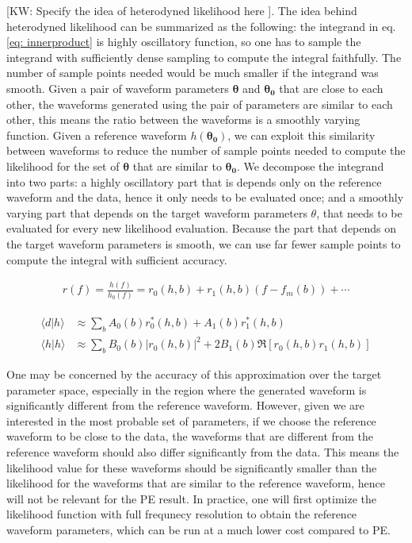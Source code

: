 \documentclass[twocolumn]{aastex631}
\newcommand{\kw}[1]{{\color{rb4}[KW: #1 ]}}
\begin{document}
\kw{Specify the idea of heterodyned likelihood here}. The idea behind
heterodyned likelihood can be summarized as the following: the integrand in eq.
\ref{eq: innerproduct} is highly oscillatory function, so one has to sample the
integrand with sufficiently dense sampling to compute the integral faithfully.
The number of sample points needed would be much smaller if the integrand was
smooth. Given a pair of waveform parameters $\mathbf{\theta}$ and
$\mathbf{\theta_0}$ that are close to each other, the waveforms generated using
the pair of parameters are similar to each other, this means the ratio between
the waveforms is a smoothly varying function. Given a reference waveform
$h(\mathbf{\theta_0})$, we can exploit this similarity between waveforms to
reduce the number of sample points needed to compute the likelihood for the set
of $\mathbf{\theta}$ that are similar to $\mathbf{\theta_0}$. We decompose
the integrand into two parts: a highly oscillatory part that is depends only on
the reference waveform and the data, hence it only needs to be evaluated once;
and a smoothly varying part that depends on the target waveform parameters
$\theta$, that needs to be evaluated for every new likelihood evaluation.
Because the part that depends on the target waveform parameters is smooth, we
can use far fewer sample points to compute the integral with sufficient
accuracy.


\begin{align}
r(f) = \frac{h(f)}{h_0(f)} = r_0(h,b) + r_1(h,b)(f- f_m(b)) + \cdots
\end{align}

\begin{align}
    \langle d|h \rangle &\approx \sum_b A_0(b) r^*_0(h,b) + A_1(b) r^*_1(h,b) \nonumber \\
    \langle h|h \rangle &\approx \sum_b B_0(b) |r_0(h,b)|^2 + 2 B_1(b) \Re[r_0(h,b)r_1(h,b)]
\end{align}

One may be concerned by the accuracy of this approximation over the target
parameter space, especially in the region where the generated waveform is
significantly different from the reference waveform. However, given we are
interested in the most probable set of parameters, if we choose the reference
waveform to be close to the data, the waveforms that are different from the
reference waveform should also differ significantly from the data. This means
the likelihood value for these waveforms should be significantly smaller than
the likelihood for the waveforms that are similar to the reference waveform,
hence will not be relevant for the PE result. In practice, one will first
optimize the likelihood function with full frequnecy resolution to obtain the
reference waveform parameters, which can be run at a much lower cost compared to
PE.
\end{document}

